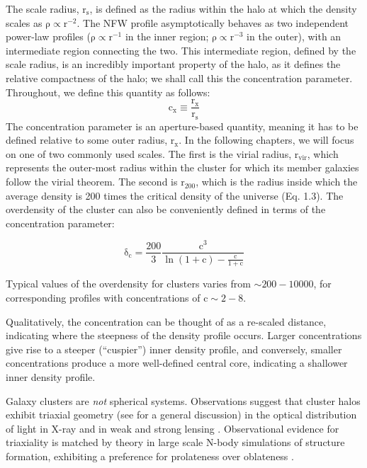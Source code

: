 The scale radius, $\mathrm{r_{s}}$, is defined as the radius within the halo at which the density scales as $\mathrm{\rho \propto r^{-2}}$. The NFW profile asymptotically behaves as two independent power-law profiles ($\mathrm{\rho \propto r^{-1}}$ in the inner region; $\mathrm{\rho \propto r^{-3}}$ in the outer), with an intermediate region connecting the two. This intermediate region, defined by the scale radius, is an incredibly important property of the halo, as it defines the relative compactness of the halo; we shall call this the concentration parameter. Throughout, we define this quantity as follows:
\begin{equation}
\mathrm{ c_{x} \equiv \frac{r_{x}}{r_{s}} }
\end{equation} 
The concentration parameter is an aperture-based quantity, meaning it has to be defined relative to some outer radius, $\mathrm{r_{x}}$. In the following chapters, we will focus on one of two commonly used scales. The first is the virial radius, $\mathrm{r_{vir}}$, which represents the outer-most radius within the cluster for which its member galaxies follow the virial theorem. The second is $\mathrm{r_{200}}$, which is the radius inside which the average density is 200 times the critical density of the universe (Eq. 1.3). The overdensity of the cluster can also be conveniently defined in terms of the concentration parameter:
 
\begin{equation}
\mathrm{\delta_{c} = \frac{200}{3} \frac{c^{3}}{\ln (1+c) - \frac{c}{1+c}}}
\end{equation}

Typical values of the overdensity for clusters varies from $\mathrm{\sim 200 - 10000}$, for corresponding profiles with concentrations of $\mathrm{c \sim 2 - 8}$.

Qualitatively, the concentration can be thought of as a re-scaled distance, indicating where the steepness of the density profile occurs. Larger concentrations give rise to a steeper (``cuspier'') inner density profile, and conversely, smaller concentrations produce a more well-defined central core, indicating a shallower inner density profile. 

Galaxy clusters are {\em not} spherical systems. Observations suggest that cluster halos exhibit triaxial geometry (see \citealt{LimousinEtAl2013} for a general discussion) in the optical distribution of light \citep{CarterMetcalfe1980,Binggeli1982} in X-ray \citep{FabricantEtAl1985,LauEtAl2012} and in weak \citep{EvansBridle2009,OguriEtAl2010,OguriEtAl2012} and strong 
lensing \citep{SoucailEtAl1987}. Observational evidence for triaxiality is matched by theory in large scale N-body simulations of structure formation, exhibiting a preference for prolateness over
oblateness \citep{FrenkEtAl1988,DubinskiCarlberg1991,WarrenEtAl1992,ColeLacey1996,JS2002,HopkinsEtAl2005,BailinSteinmetz2005,KasunEvrard2005,PazEtAl2006,AllgoodEtAl2006,BettEtAl2007,MunozEtAl2011,GaoEtAl2012,DespaliEtAl2014}.       



